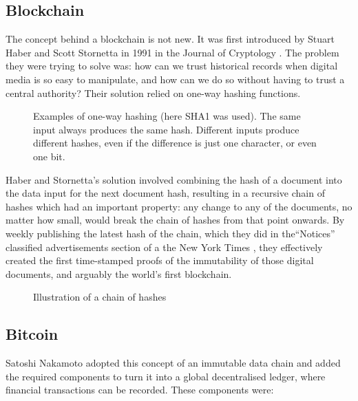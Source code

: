 \subsection{Blockchain}
\label{sub:blockchain}

The concept behind a blockchain is not new. It was first introduced by Stuart Haber and Scott Stornetta in 1991 in the Journal of Cryptology \cite{haberHowTimeStampDigital1991}. The problem they were trying to solve was: how can we trust historical records when digital media is so easy to manipulate, and how can we do so without having to trust a central authority? Their solution relied on one-way hashing functions.


\begin{figure}[h]
    \centering
    
    \caption[One-way hashing examples]{Examples of one-way hashing (here SHA1 was used). The same input always produces the same hash. Different inputs produce different hashes, even if the difference is just one character, or even one bit.}
    \label{fig:hashing}
\end{figure}

Haber and Stornetta's solution involved combining the hash of a document into the data input for the next document hash, resulting in a recursive chain of hashes which had an important property: any change to any of the documents, no matter how small, would break the chain of hashes from that point onwards.
By weekly publishing the latest hash of the chain, which they did in the``Notices'' classified advertisements section of a the New York Times \cite{whitakerArtBlockchainPrimer2019}, they effectively created the first time-stamped proofs of the immutability of those digital documents, and arguably the world's first blockchain.

\begin{figure}[h]
    \centering
    
    \caption[Illustration of a chain of hashes]{Illustration of a chain of hashes}
    \label{fig:hashing}
\end{figure}


\subsection{Bitcoin}

Satoshi Nakamoto \cite{nakamotoBitcoinPeertopeerElectronic2008a}  adopted this concept of an immutable data chain and added the required components to turn it into a global decentralised ledger, where financial transactions can be recorded. These components were:

